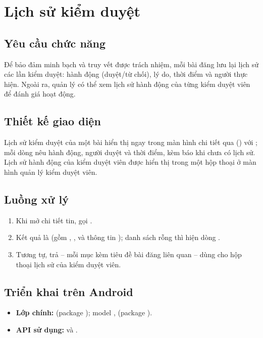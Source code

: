 \section{Lịch sử kiểm duyệt}
\label{sec:c6_history}

\subsection{Yêu cầu chức năng}
Để bảo đảm minh bạch và truy vết được trách nhiệm, mỗi bài đăng lưu lại lịch sử
các lần kiểm duyệt: hành động (duyệt/từ chối), lý do, thời điểm và người thực
hiện. Ngoài ra, quản lý có thể xem lịch sử hành động của từng kiểm duyệt viên
để đánh giá hoạt động.

\subsection{Thiết kế giao diện}
Lịch sử kiểm duyệt của một bài hiển thị ngay trong màn hình chi tiết qua
 () với ; mỗi dòng
nêu hành động, người duyệt và thời điểm, kèm  báo khi chưa có
lịch sử. Lịch sử hành động của kiểm duyệt viên được hiển thị trong một hộp
thoại ở màn hình quản lý kiểm duyệt viên.

\subsection{Luồng xử lý}
\begin{enumerate}
    \item Khi mở chi tiết tin, 
    gọi .
    \item Kết quả là  (gồm
    , ,  và thông tin
    ); danh sách rỗng thì hiện dòng .
    \item Tương tự,  trả
     -- mỗi mục kèm tiêu đề bài đăng liên
    quan -- dùng cho hộp thoại lịch sử của kiểm duyệt viên.
\end{enumerate}

\subsection{Triển khai trên Android}
\begin{itemize}
    \item \textbf{Lớp chính:}  (package
    ); model ,
     (package ).
    \item \textbf{API sử dụng:}  và
    .
\end{itemize}

